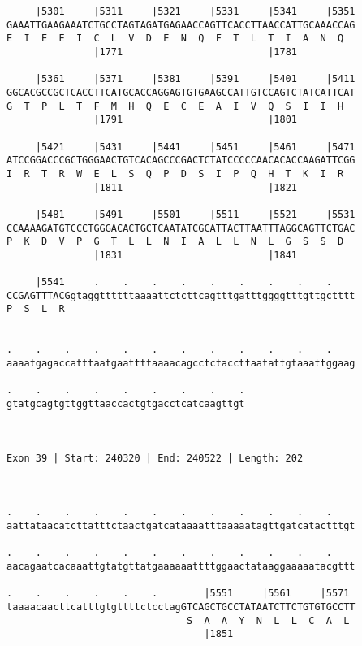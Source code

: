 \documentclass{article}
\begin{document}
\begin{Verbatim}
     |5301     |5311     |5321     |5331     |5341     |5351
GAAATTGAAGAAATCTGCCTAGTAGATGAGAACCAGTTCACCTTAACCATTGCAAACCAG
E  I  E  E  I  C  L  V  D  E  N  Q  F  T  L  T  I  A  N  Q  
               |1771                         |1781          
  
     |5361     |5371     |5381     |5391     |5401     |5411
GGCACGCCGCTCACCTTCATGCACCAGGAGTGTGAAGCCATTGTCCAGTCTATCATTCAT
G  T  P  L  T  F  M  H  Q  E  C  E  A  I  V  Q  S  I  I  H  
               |1791                         |1801          
  
     |5421     |5431     |5441     |5451     |5461     |5471
ATCCGGACCCGCTGGGAACTGTCACAGCCCGACTCTATCCCCCAACACACCAAGATTCGG
I  R  T  R  W  E  L  S  Q  P  D  S  I  P  Q  H  T  K  I  R  
               |1811                         |1821          
  
     |5481     |5491     |5501     |5511     |5521     |5531
CCAAAAGATGTCCCTGGGACACTGCTCAATATCGCATTACTTAATTTAGGCAGTTCTGAC
P  K  D  V  P  G  T  L  L  N  I  A  L  L  N  L  G  S  S  D  
               |1831                         |1841          
  
     |5541     .    .    .    .    .    .    .    .    .    
CCGAGTTTACGgtaggttttttaaaattctcttcagtttgatttggggtttgttgctttt
P  S  L  R                                                  
                                                            
  
.    .    .    .    .    .    .    .    .    .    .    .    
aaaatgagaccatttaatgaattttaaaacagcctctaccttaatattgtaaattggaag
                                                            
.    .    .    .    .    .    .    .    .
gtatgcagtgttggttaaccactgtgacctcatcaagttgt
                                         
                                         
 
Exon 39 | Start: 240320 | End: 240522 | Length: 202



.    .    .    .    .    .    .    .    .    .    .    .    
aattataacatcttatttctaactgatcataaaatttaaaaatagttgatcatactttgt
                                                            
.    .    .    .    .    .    .    .    .    .    .    .    
aacagaatcacaaattgtatgttatgaaaaaattttggaactataaggaaaaatacgttt
                                                            
.    .    .    .    .    .        |5551     |5561     |5571 
taaaacaacttcatttgtgttttctcctagGTCAGCTGCCTATAATCTTCTGTGTGCCTT
                               S  A  A  Y  N  L  L  C  A  L 
                                  |1851                     
  

\end{Verbatim}
\end{document}
